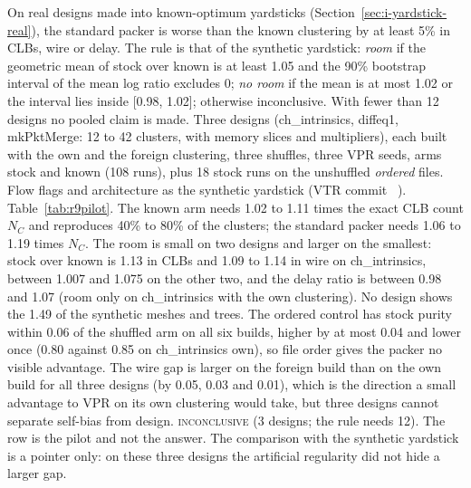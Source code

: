  On real designs made into known-optimum yardsticks (Section~\ref{sec:i-yardstick-real}), the standard packer is worse than the known clustering by at least 5\% in CLBs, wire or delay. The rule is that of the synthetic yardstick: \emph{room} if the geometric mean of stock over known is at least 1.05 and the 90\% bootstrap interval of the mean log ratio excludes 0; \emph{no room} if the mean is at most 1.02 or the interval lies inside [0.98, 1.02]; otherwise inconclusive. With fewer than 12 designs no pooled claim is made.
 Three designs (ch\_intrinsics, diffeq1, mkPktMerge: 12 to 42 clusters, with memory slices and multipliers), each built with the own and the foreign clustering, three shuffles, three VPR seeds, arms stock and known (108 runs), plus 18 stock runs on the unshuffled \emph{ordered} files. Flow flags and architecture as the synthetic yardstick (VTR commit ~\cite{rose2012vtr,elgammal2025vtr9}). Table~\ref{tab:r9pilot}.
 The known arm needs 1.02 to 1.11 times the exact CLB count $N_C$ and reproduces 40\% to 80\% of the clusters; the standard packer needs 1.06 to 1.19 times $N_C$. The room is small on two designs and larger on the smallest: stock over known is 1.13 in CLBs and 1.09 to 1.14 in wire on ch\_intrinsics, between 1.007 and 1.075 on the other two, and the delay ratio is between 0.98 and 1.07 (room only on ch\_intrinsics with the own clustering). No design shows the 1.49 of the synthetic meshes and trees. The ordered control has stock purity within 0.06 of the shuffled arm on all six builds, higher by at most 0.04 and lower once (0.80 against 0.85 on ch\_intrinsics own), so file order gives the packer no visible advantage. The wire gap is larger on the foreign build than on the own build for all three designs (by 0.05, 0.03 and 0.01), which is the direction a small advantage to VPR on its own clustering would take, but three designs cannot separate self-bias from design. %
 \textsc{inconclusive} (3 designs; the rule needs 12). The row is the pilot and not the answer. The comparison with the synthetic yardstick is a pointer only: on these three designs the artificial regularity did not hide a larger gap.

